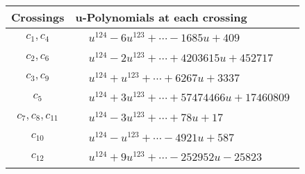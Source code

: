 \documentclass[1p]{elsarticle_modified}
\theoremstyle{definition}
\begin{document}
\begin{tabular}{m{50pt}|m{274pt}}
Crossings & \hspace{64pt}u-Polynomials at each crossing \\
\hline $$\begin{aligned}c_{1},c_{4}\end{aligned}$$&$\begin{aligned}
&u^{124}-6 u^{123}+\cdots-1685 u+409
\end{aligned}$\\
\hline $$\begin{aligned}c_{2},c_{6}\end{aligned}$$&$\begin{aligned}
&u^{124}-2 u^{123}+\cdots+4203615 u+452717
\end{aligned}$\\
\hline $$\begin{aligned}c_{3},c_{9}\end{aligned}$$&$\begin{aligned}
&u^{124}+u^{123}+\cdots+6267 u+3337
\end{aligned}$\\
\hline $$\begin{aligned}c_{5}\end{aligned}$$&$\begin{aligned}
&u^{124}+3 u^{123}+\cdots+57474466 u+17460809
\end{aligned}$\\
\hline $$\begin{aligned}c_{7},c_{8},c_{11}\end{aligned}$$&$\begin{aligned}
&u^{124}-3 u^{123}+\cdots+78 u+17
\end{aligned}$\\
\hline $$\begin{aligned}c_{10}\end{aligned}$$&$\begin{aligned}
&u^{124}- u^{123}+\cdots-4921 u+587
\end{aligned}$\\
\hline $$\begin{aligned}c_{12}\end{aligned}$$&$\begin{aligned}
&u^{124}+9 u^{123}+\cdots-252952 u-25823
\end{aligned}$\\
\hline
\end{tabular}\\~\\
\end{document}

